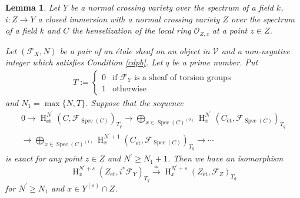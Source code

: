 \documentclass{article}
\newtheorem{lem}[thm]{\indent \sc Lemma}
\newcommand{\spec}{\operatorname{Spec}}
\newcommand{\et}{\mathrm{\acute{e}t}}
\newcommand{\HO}{\operatorname{H}}
\begin{document}
%
\begin{lem}\upshape\label{sredis}
Let $Y$ be a normal crossing variety over the spectrum of a field $k$,
$i: Z\to Y$  a closed immersion with
a normal crossing variety $Z$ over the spectrum of a field $k$
and $C$ the henselization of the local ring
$\mathcal{O}_{Z, z}$
at a point $z\in Z$.

Let $(\mathcal{F}_{X}, N)$ be a pair of an \'{e}tale sheaf on an object
in $\mathcal{V}$
and a non-negative integer which satisfies Condition \ref{cdpb}.
Let $q$ be a prime number. Put
%
\begin{align*}
T:=
\left\{
%
\begin{array}{ll}
0  &  \textrm{if $\mathcal{F}_{Y}$ is a sheaf of torsion groups}  \\ [5pt]
1   &  \textrm{otherwise}
\end{array}
%
\right.
\end{align*}
%
and $N_{1}=\operatorname{max}\{N, T\}$. Suppose that the sequence
%
\begin{align}\label{CTex}
0\to 
\HO^{N^{\prime}}_{\et}(
C,
\mathcal{F}_{\spec(C)}
)_{T_{q}}
\to
\bigoplus_{x\in\spec(C)^{(0)}}
\HO^{N^{\prime}}_{x}(
C_{\et},
\mathcal{F}_{\spec(C)}
)_{T_{q}} 
\nonumber
\\
\to
\bigoplus_{x\in \spec(C)^{(1)}}
\HO^{N^{\prime}+1}_{x}(
C_{\et}, \mathcal{F}_{\spec(C)}
)_{T_{q}}
\to \cdots
\end{align}
%
is exact for any point $z\in Z$ and
$N^{\prime}\geq N_{1}+1$. Then we have an isomorphism
%
\begin{equation}\label{sisofit}
\HO^{N^{\prime}+s}_{x}(
Z_{\et},
i^{*}\mathcal{F}_{Y}
)_{T_{q}}   
\xrightarrow{\simeq}
\HO^{N^{\prime}+s}_{x}(
Z_{\et},
\mathcal{F}_{Z}
)_{T_{q}}
\end{equation}
%
for $N^{\prime}\geq N_{1}$ and
$x\in Y^{(s)}\cap Z$.
\end{lem}
%
\end{document}
